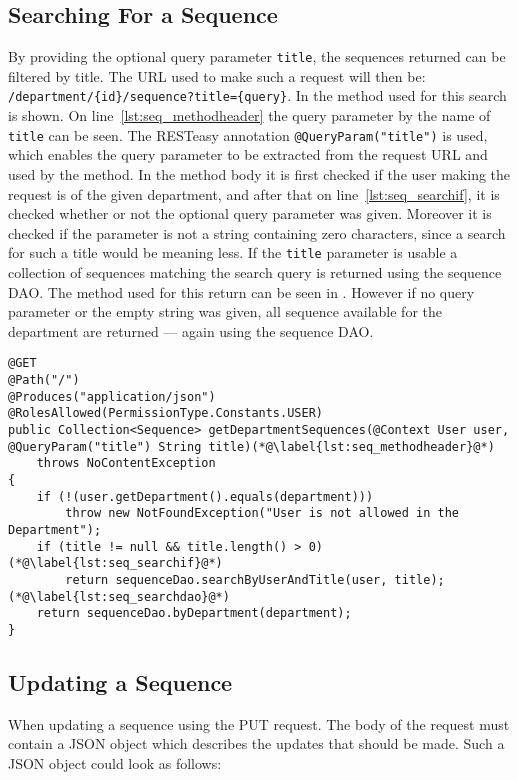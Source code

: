 \subsection{Searching For a Sequence}
By providing the optional query parameter \texttt{title}, the sequences returned can be filtered by title.
The URL used to make such a request will then be: \texttt{/department/\{id\}/sequence?title=\{query\}}.
In  the method used for this search is shown.
On line~\ref{lst:seq_methodheader} the query parameter by the name of \texttt{title} can be seen.
The RESTeasy annotation \texttt{@QueryParam("title")} is used, which enables the query parameter to be extracted from the request URL and used by the method.
In the method body it is first checked if the user making the request is of the given department, and after that on line~\ref{lst:seq_searchif}, it is checked whether or not the optional query parameter was given.
Moreover it is checked if the parameter is not a string containing zero characters, since a search for such a title would be meaning less.
If the \texttt{title} parameter is usable a collection of sequences matching the search query is returned using the sequence DAO.
The method used for this return can be seen in .
However if no query parameter or the empty string was given, all sequence available for the department are returned --- again using the sequence DAO.  

\begin{lstlisting}[float, floatplacement=h, caption={The method which returns a list of sequences; and it can be filtered using a query parameter.}, label={lst:seq_serviceget}]
@GET
@Path("/")
@Produces("application/json")
@RolesAllowed(PermissionType.Constants.USER)
public Collection<Sequence> getDepartmentSequences(@Context User user, @QueryParam("title") String title)(*@\label{lst:seq_methodheader}@*)
    throws NoContentException
{
    if (!(user.getDepartment().equals(department)))
        throw new NotFoundException("User is not allowed in the Department");
    if (title != null && title.length() > 0)(*@\label{lst:seq_searchif}@*)
        return sequenceDao.searchByUserAndTitle(user, title);(*@\label{lst:seq_searchdao}@*)
    return sequenceDao.byDepartment(department);
}	
\end{lstlisting}

\subsection{Updating a Sequence}
When updating a sequence using the PUT request.
The body of the request must contain a JSON object which describes the updates that should be made.
Such a JSON object could look as follows:

